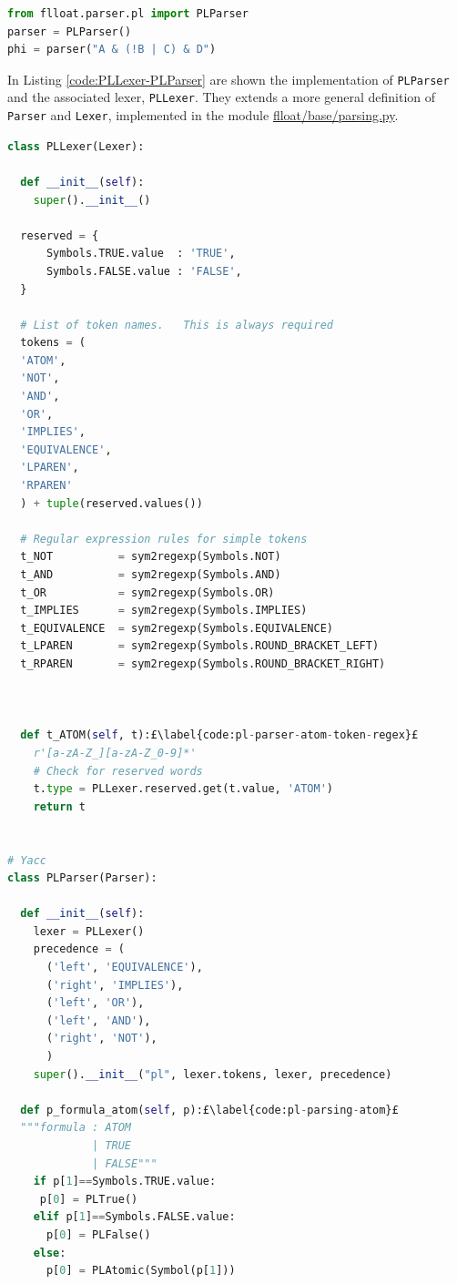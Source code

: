 \begin{lstlisting}[language=Python, style=Python, escapechar = £, label={code:pl-parsing-example}, caption={How to parse a \PL formula: \texttt{PLParser}}]
from flloat.parser.pl import PLParser
parser = PLParser()
phi = parser("A & (!B | C) & D")
\end{lstlisting}

In Listing \ref{code:PLLexer-PLParser} are shown the implementation of \texttt{PLParser} and the associated lexer, \texttt{PLLexer}. They extends a more general definition of \texttt{Parser} and \texttt{Lexer}, implemented in the module \href{https://github.com/MarcoFavorito/flloat/blob/0.1.4/flloat/base/parsing.py}{flloat/base/parsing.py}.
\begin{lstlisting}[language=Python, style=Python, escapechar = £, label={code:PLLexer-PLParser}, caption={\texttt{PLLexer} and \texttt{PLParser}}]
class PLLexer(Lexer):

  def __init__(self):
    super().__init__()

  reserved = {
      Symbols.TRUE.value  : 'TRUE',
      Symbols.FALSE.value : 'FALSE',
  }

  # List of token names.   This is always required
  tokens = (
  'ATOM',
  'NOT',
  'AND',
  'OR',
  'IMPLIES',
  'EQUIVALENCE',
  'LPAREN',
  'RPAREN'
  ) + tuple(reserved.values())

  # Regular expression rules for simple tokens
  t_NOT          = sym2regexp(Symbols.NOT)
  t_AND          = sym2regexp(Symbols.AND)
  t_OR           = sym2regexp(Symbols.OR)
  t_IMPLIES      = sym2regexp(Symbols.IMPLIES)
  t_EQUIVALENCE  = sym2regexp(Symbols.EQUIVALENCE)
  t_LPAREN       = sym2regexp(Symbols.ROUND_BRACKET_LEFT)
  t_RPAREN       = sym2regexp(Symbols.ROUND_BRACKET_RIGHT)



  def t_ATOM(self, t):£\label{code:pl-parser-atom-token-regex}£
    r'[a-zA-Z_][a-zA-Z_0-9]*'
    # Check for reserved words
    t.type = PLLexer.reserved.get(t.value, 'ATOM')  
    return t


# Yacc 
class PLParser(Parser):

  def __init__(self):
    lexer = PLLexer()
    precedence = (
      ('left', 'EQUIVALENCE'),
      ('right', 'IMPLIES'),
      ('left', 'OR'),
      ('left', 'AND'),
      ('right', 'NOT'),
      )
    super().__init__("pl", lexer.tokens, lexer, precedence)

  def p_formula_atom(self, p):£\label{code:pl-parsing-atom}£
  """formula : ATOM
             | TRUE
             | FALSE"""
    if p[1]==Symbols.TRUE.value:
     p[0] = PLTrue()
    elif p[1]==Symbols.FALSE.value:
      p[0] = PLFalse()
    else:
      p[0] = PLAtomic(Symbol(p[1]))


\end{lstlisting}
